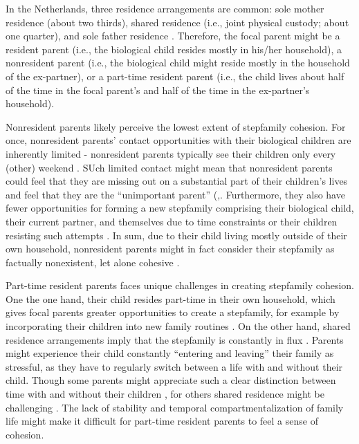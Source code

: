 \documentclass[\pandocDocMode,longtable,floatsintext]{apa6}
\begin{document}
In the Netherlands, three residence arrangements are common: sole mother
residence (about two thirds), shared residence (i.e., joint physical
custody; about one quarter), and sole father residence
\autocite{poortman2017shared}. Therefore, the focal parent might be a
resident parent (i.e., the biological child resides mostly in his/her
household), a nonresident parent (i.e., the biological child might
reside mostly in the household of the ex-partner), or a part-time
resident parent (i.e., the child lives about half of the time in the
focal parent's and half of the time in the ex-partner's household).

Nonresident parents likely perceive the lowest extent of stepfamily
cohesion. For once, nonresident parents' contact opportunities with
their biological children are inherently limited - nonresident parents
typically see their children only every (other) weekend
\autocite{kelly2007children}. SUch limited contact might mean that
nonresident parents could feel that they are missing out on a
substantial part of their children's lives and feel that they are the
``unimportant parent''
(\autocite{kielty2005mothers},\autocite{stewart1999disneyland}.
Furthermore, they also have fewer opportunities for forming a new
stepfamily comprising their biological child, their current partner, and
themselves due to time constraints or their children resisting such
attempts \autocite{jensen2015perceived}. In sum, due to their child
living mostly outside of their own household, nonresident parents might
in fact consider their stepfamily as factually nonexistent, let alone
cohesive \autocite{kielty2005mothers}.

Part-time resident parents faces unique challenges in creating
stepfamily cohesion. One the one hand, their child resides part-time in
their own household, which gives focal parents greater opportunities to
create a stepfamily, for example by incorporating their children into
new family routines \autocite{bakker2015family}. On the other hand,
shared residence arrangements imply that the stepfamily is constantly in
flux \autocite{carlsund2014swedish}. Parents might experience their
child constantly ``entering and leaving'' their family as stressful, as
they have to regularly switch between a life with and without their
child. Though some parents might appreciate such a clear distinction
between time with and without their children
\autocite{botterman2015social}, for others shared residence might be
challenging \autocite{walper2021shared}. The lack of stability and
temporal compartmentalization of family life might make it difficult for
part-time resident parents to feel a sense of cohesion.
\end{document}
